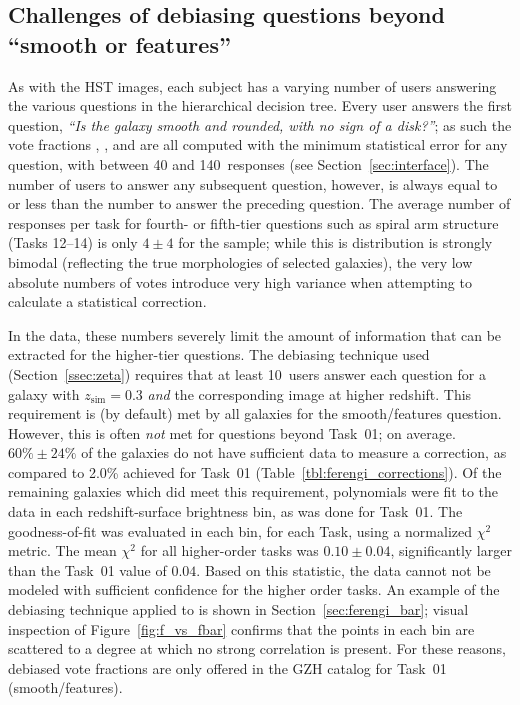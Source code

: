 \documentclass[twocolumn]{aastex6}
\begin{document}
\subsection{Challenges of debiasing questions beyond ``smooth or features''}
\label{ssec:higher_order_tasks}
As with the HST images, each \ferengi{} subject has a varying number of users answering the various questions in the hierarchical decision tree. Every user answers the first question, {\it ``Is the galaxy smooth and rounded, with no sign of a disk?''}; as such the vote fractions \fsmooth, \ffeatures, and \fartifact{} are all computed with the minimum statistical error for any question, with between 40 and 140~responses (see Section~\ref{sec:interface}). The number of users to answer any subsequent question, however, is always equal to or less than the number to answer the preceding question. The average number of responses per task for fourth- or fifth-tier questions such as spiral arm structure (Tasks 12--14) is only $4\pm4$ for the \ferengi{} sample; while this is distribution is strongly bimodal (reflecting the true morphologies of selected galaxies), the very low absolute numbers of votes introduce very high variance when attempting to calculate a statistical correction.

In the \ferengi{} data, these numbers severely limit the amount of information that can be extracted for the higher-tier questions. The debiasing technique used (Section~\ref{ssec:zeta}) requires that at least 10~users answer each question for a galaxy with $z_\mathrm{sim}=0.3$ \emph{and} the corresponding image at higher redshift. This requirement is (by default) met by all galaxies for the smooth/features question. However, this is often \emph{not} met for questions beyond Task~01; on average. $60\%\pm24\%$ of the galaxies do not have sufficient data to measure a correction, as compared to 2.0\% achieved for Task~01 (Table~\ref{tbl:ferengi_corrections}). Of the remaining \ferengi{} galaxies which did meet this requirement, polynomials were fit to the data in each redshift-surface brightness bin, as was done for Task~01. The goodness-of-fit was evaluated in each bin, for each Task, using a normalized $\chi^2$ metric. The mean $\chi^2$ for all higher-order tasks was $0.10\pm0.04$, significantly larger than the Task~01 value of $0.04$. Based on this statistic, the data cannot not be modeled with sufficient confidence for the higher order tasks. An example of the debiasing technique applied to \fbar{} is shown in Section~\ref{sec:ferengi_bar}; visual inspection of Figure~\ref{fig:f_vs_fbar} confirms that the points in each bin are scattered to a degree at which no strong correlation is present. For these reasons, debiased vote fractions are only offered in the GZH catalog for Task~01 (smooth/features).  
\end{document}
